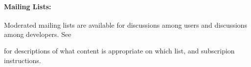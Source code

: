 \paragraph{Mailing Lists:}

Moderated mailing lists are available for discussions among users and
discussions among developers.
See
\begin{quote}
\end{quote}
for descriptions of what content is appropriate on which list, and
subscripion instructions.

\endinput

\paragraph{Reporting bugs:}

If Unison is not working the way you expect, see the instructions for
debugging, reporting bugs, and asking for help at
\begin{quote}
\ONEURL{https://github.com/bcpierce00/unison/wiki/Reporting-Bugs-and-Feature-Requests}
\end{quote}

\paragraph{Feature Requests:}

Please see the URL in the previous section for guidance on feature
requests.
